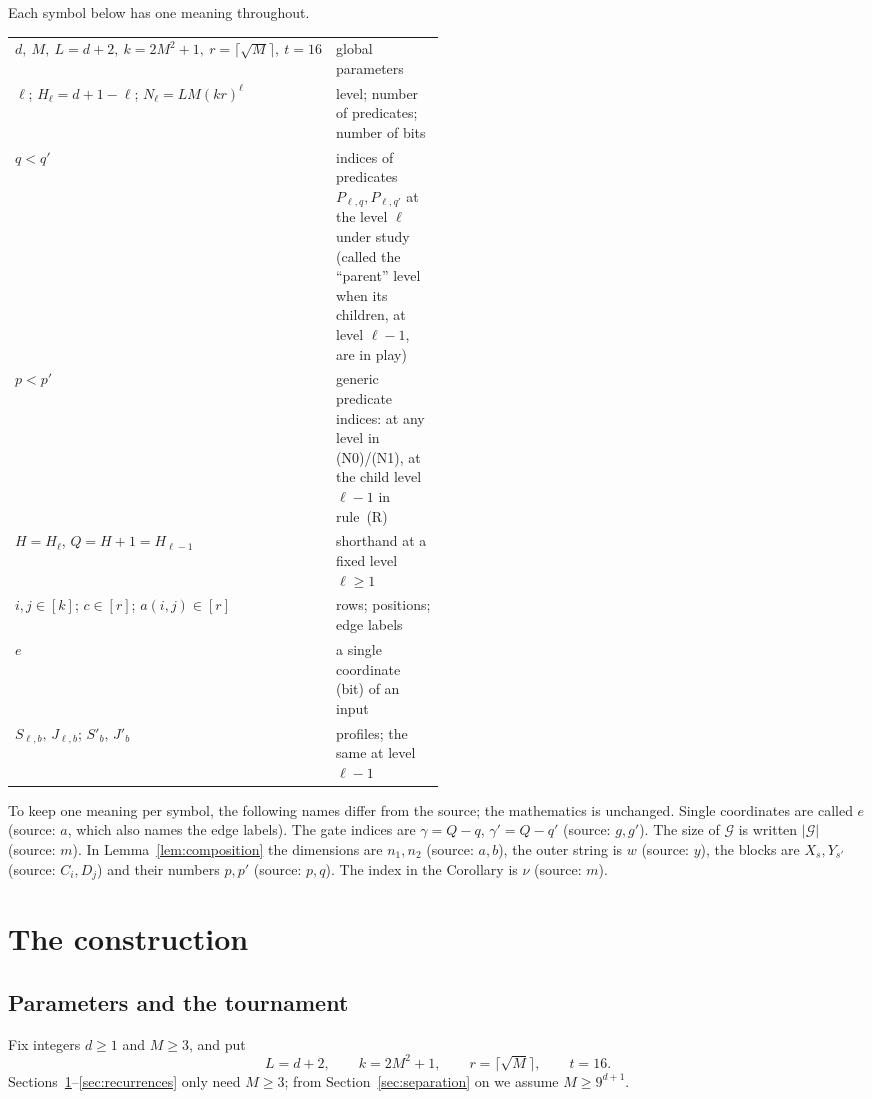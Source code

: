 \documentclass[11pt]{article}
\theoremstyle{definition}
\theoremstyle{remark}
\begin{document}
Each symbol below has one meaning throughout.
\begin{center}
\begin{tabular}{lp{0.5\linewidth}}
\(d,\ M,\ L=d+2,\ k=2M^2+1,\ r=\lceil\sqrt M\rceil,\ t=16\) & global parameters\\
\(\ell\); \(H_\ell=d+1-\ell\); \(N_\ell=LM(kr)^\ell\) & level; number of predicates; number of bits\\
\(q<q'\) & indices of predicates \(P_{\ell,q},P_{\ell,q'}\) at the level \(\ell\) under study (called the ``parent'' level when its children, at level \(\ell-1\), are in play)\\
\(p<p'\) & generic predicate indices: at any level in (N0)/(N1), at the child level \(\ell-1\) in rule~(R)\\
\(H=H_\ell\), \(Q=H+1=H_{\ell-1}\) & shorthand at a fixed level \(\ell\ge1\)\\
\(i,j\in[k]\); \(c\in[r]\); \(a(i,j)\in[r]\) & rows; positions; edge labels\\
\(e\) & a single coordinate (bit) of an input\\
\(S_{\ell,b},\,J_{\ell,b}\); \(S'_b,\,J'_b\) & profiles; the same at level \(\ell-1\)\\
\end{tabular}
\end{center}
To keep one meaning per symbol, the following names differ from the source;
the mathematics is unchanged. Single coordinates are called \(e\) (source:
\(a\), which also names the edge labels). The gate indices are
\(\gamma=Q-q\), \(\gamma'=Q-q'\) (source: \(g,g'\)). The size of
\(\mathcal G\) is written \(|\mathcal G|\) (source: \(m\)). In
Lemma~\ref{lem:composition} the dimensions are \(n_1,n_2\) (source: \(a,b\)),
the outer string is \(w\) (source: \(y\)), the blocks are
\(X_s,Y_{s'}\) (source: \(C_i,D_j\)) and their numbers \(p,p'\) (source:
\(p,q\)). The index in the Corollary is \(\nu\) (source: \(m\)).

\section{The construction}
\label{sec:construction}

\subsection{Parameters and the tournament}

Fix integers \(d\ge1\) and \(M\ge3\), and put
\[
 L=d+2,\qquad k=2M^2+1,\qquad r=\lceil\sqrt M\rceil,
 \qquad t=16.
\]
Sections~\ref{sec:construction}--\ref{sec:recurrences} only need \(M\ge3\);
from Section~\ref{sec:separation} on we assume \(M\ge 9^{d+1}\).
\end{document}
